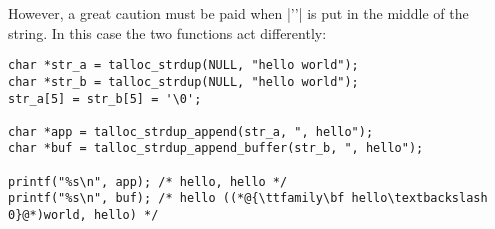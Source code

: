 However, a great caution must be paid when |'\0'| is put in the middle of the
string. In this case the two functions act differently:

\begin{lstlisting}[caption={Zero in the middle of a string}]
char *str_a = talloc_strdup(NULL, "hello world");
char *str_b = talloc_strdup(NULL, "hello world");
str_a[5] = str_b[5] = '\0';

char *app = talloc_strdup_append(str_a, ", hello");
char *buf = talloc_strdup_append_buffer(str_b, ", hello");

printf("%s\n", app); /* hello, hello */
printf("%s\n", buf); /* hello ((*@{\ttfamily\bf hello\textbackslash 0}@*)world, hello) */
\end{lstlisting}
